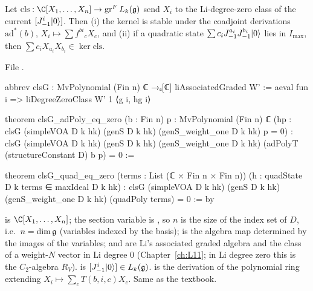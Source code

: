 \begin{proposition}\label{l23:prop:clsG}
Let $\mathrm{cls}:\C[X_1,\dots,X_n]\to\operatorname{gr}^F L_k(\lxxiiig)$ send $X_i$ to the Li-degree-zero class of the current
$[J^i_{-1}|0\rangle]$. Then (i) the kernel is stable under the coadjoint derivations $\mathrm{ad}^*(b)$, $X_i\mapsto\sum f^{bi}{}_cX_c$,
and (ii) if a quadratic state $\sum c_iJ^{a_i}_{-1}J^{b_i}_{-1}|0\rangle$ lies in $I_{\max}$, then
$\sum c_iX_{a_i}X_{b_i}\in\ker\mathrm{cls}$.
\end{proposition}
\noindent File .
\begin{leancode}
abbrev clsG : MvPolynomial (Fin n) ℂ →ₐ[ℂ] liAssociatedGraded W' :=
  aeval fun i => liDegreeZeroClass W' 1 ⟨g i, hg i⟩

theorem clsG_adPoly_eq_zero (b : Fin n) {p : MvPolynomial (Fin n) ℂ}
    (hp : clsG (simpleVOA D k hk) (genS D k hk) (genS_weight_one D k hk) p = 0) :
    clsG (simpleVOA D k hk) (genS D k hk) (genS_weight_one D k hk)
      (adPolyT (structureConstant D) b p) = 0 :=

theorem clsG_quad_eq_zero (terms : List (ℂ × Fin n × Fin n)) (h : quadState D k terms ∈ maxIdeal D k hk) :
    clsG (simpleVOA D k hk) (genS D k hk) (genS_weight_one D k hk) (quadPoly terms) = 0 := by
\end{leancode}

\begin{dictionary}
 is $\C[X_1,\dots,X_n]$; the section variable is , so $n$ is the size of the
index set of $D$, i.e.\ $n=\dim\mathfrak g$ (variables indexed by the basis);  is the algebra map determined by the images of the variables;
 and  are Li's associated graded algebra and the class of a weight-$N$ vector in
Li degree $0$ (Chapter~\ref{ch:L11}; in Li degree zero this is the $C_2$-algebra $R_V$).  is $[J^i_{-1}|0\rangle]\in L_k(\mathfrak g)$.
 is the derivation of the polynomial ring extending $X_i\mapsto\sum_cT(b,i,c)X_c$. Same as the textbook.
\end{dictionary}

